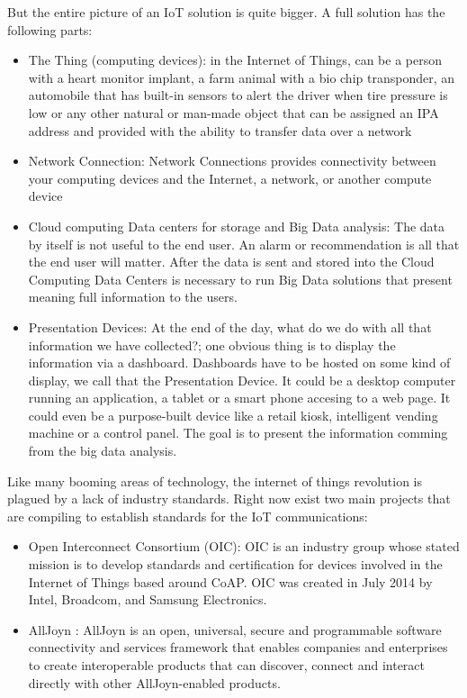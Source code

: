 But the entire picture of an IoT solution is quite bigger. A full solution has 
the following parts:

\begin{itemize} 

\item The Thing (computing devices):  in the Internet of
Things, can be a person with a heart monitor implant, a farm animal with a bio
chip transponder, an automobile that has built-in sensors to alert the driver
when tire pressure is low or any other natural or man-made object that can be
assigned an IPA address and provided with the ability to transfer data over a
network 

\item Network Connection: Network Connections provides connectivity
between your computing devices  and the Internet, a network, or another compute
device 

\item Cloud computing Data centers for storage and Big Data analysis: The data
by itself is not useful to the end user. An alarm or recommendation is all that
the end user will matter. After the data is sent and stored into the Cloud
Computing Data Centers is necessary to run Big Data solutions that present
meaning full information to the users.  

\item Presentation Devices: At the end of the day, what do we do with all that
information we have collected?; one obvious thing is to display the information
via a dashboard. Dashboards have to be hosted on some kind of display, we call
that the Presentation Device.  It could be a desktop computer running an 
application, a tablet or a smart phone accesing to a web page. It could
even be a purpose-built device like a retail kiosk, intelligent vending machine
or a control panel. The goal is to present the information comming from the big
data analysis.

\end{itemize}


Like many booming areas of technology, the internet of things
revolution is plagued by a lack of industry standards. Right now exist two main 
projects that are compiling to establish standards for the IoT communications: 

\begin{itemize}
\item Open Interconnect Consortium (OIC): OIC is an industry group whose stated 
mission is to develop standards and certification for devices involved in the 
Internet of Things based around CoAP. OIC was created in July 2014 by Intel, 
Broadcom, and Samsung Electronics.

\item AllJoyn : AllJoyn is an open, universal, secure and programmable software 
connectivity and services framework that enables companies and enterprises to 
create interoperable products that can discover, connect and interact directly 
with other AllJoyn-enabled products.
\end{itemize}

